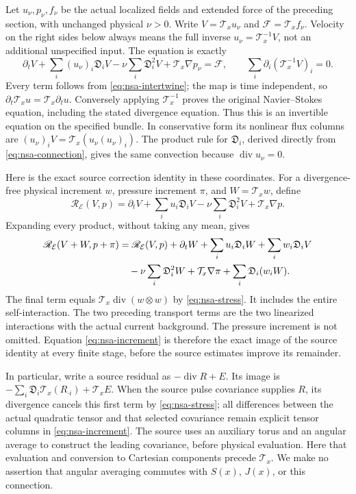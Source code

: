 Let \(u_\nu,p_\nu,f_\nu\) be the actual localized fields and extended
force of the preceding section, with unchanged physical \(\nu>0\).
Write \(V=\mathcal T_xu_\nu\) and \(\mathcal F=\mathcal T_xf_\nu\).
Velocity on the right sides below always means the full inverse
\(u_\nu=\mathcal T_x^{-1}V\), not an additional unspecified input.
The equation is exactly
\begin{equation}\label{eq:nsa-NS}
 \partial_tV+\sum_i(u_\nu)_i\mathfrak D_iV
       -\nu\sum_i\mathfrak D_i^2V+\mathcal T_x\nabla p_\nu
       =\mathcal F,\qquad
 \sum_i\partial_i(\mathcal T_x^{-1}V)_i=0 .
\end{equation}
Every term follows from \eqref{eq:nsa-intertwine}; the map is
time independent, so \(\partial_t\mathcal T_xu=\mathcal T_x\partial_tu\).
Conversely applying \(\mathcal T_x^{-1}\) proves the original
Navier--Stokes equation, including the stated divergence equation.
Thus this is an invertible equation on the specified bundle.
In conservative form its nonlinear flux columns are
\((u_\nu)_iV=\mathcal T_x(u_\nu(u_\nu)_i)\).
The product rule for \(\mathfrak D_i\), derived directly from
\eqref{eq:nsa-connection}, gives the same convection because
\(\operatorname{div}u_\nu=0\).

Here is the exact source correction identity in these coordinates.
For a divergence-free physical increment \(w\), pressure increment
\(\pi\), and \(W=\mathcal T_xw\), define
\[
 \mathscr R_{\mathcal E}(V,p)
 =\partial_tV+\sum_i u_i\mathfrak D_iV
                       -\nu\sum_i\mathfrak D_i^2V+\mathcal T_x\nabla p.
\]
Expanding every product, without taking any mean, gives
\begin{align}
 \mathscr R_{\mathcal E}(V+W,p+\pi)
 &=\mathscr R_{\mathcal E}(V,p)
     +\partial_tW+\sum_i u_i\mathfrak D_iW
     +\sum_i w_i\mathfrak D_iV \notag\\
 &\quad-\nu\sum_i\mathfrak D_i^2W+\mathcal T_x\nabla\pi
                     +\sum_i\mathfrak D_i(w_iW).
 \label{eq:nsa-increment}
\end{align}
The final term equals \(\mathcal T_x\operatorname{div}(w\otimes w)\)
by \eqref{eq:nsa-stress}. It includes the entire self-interaction.
The two preceding transport terms are the two linearized
interactions with the actual current background. The pressure
increment is not omitted. Equation \eqref{eq:nsa-increment} is
therefore the exact image of the source identity at every finite stage,
before the source estimates improve its remainder.

In particular, write a source residual as
\(-\operatorname{div}R+E\). Its image is
\(-\sum_i\mathfrak D_i\mathcal T_x(R_{\cdot i})+\mathcal T_xE\).
When the source pulse covariance supplies \(R\), its divergence
cancels this first term by \eqref{eq:nsa-stress}; all differences
between the actual quadratic tensor and that selected covariance
remain explicit tensor columns in \eqref{eq:nsa-increment}.
The source uses an auxiliary torus and an angular average to
construct the leading covariance, before physical evaluation.
Here that evaluation and conversion to Cartesian components precede
\(\mathcal T_x\). We make no assertion that angular averaging
commutes with \(S(x)\), \(J(x)\), or this connection.


